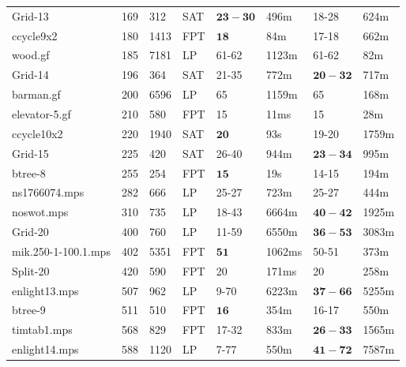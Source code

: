 \documentclass{article}
\begin{document}
\begin{longtable}{|l |l |l |l |l |l |l |l |}
Grid-13&169&312&SAT&$\mathbf{23-30}$&496m&18-28&624m\\
ccycle9x2&180&1413&FPT&$\mathbf{18}$&84m&17-18&662m\\
wood.gf&185&7181&LP&61-62&1123m&61-62&82m\\
Grid-14&196&364&SAT&21-35&772m&$\mathbf{20-32}$&717m\\
barman.gf&200&6596&LP&65&1159m&65&168m\\
elevator-5.gf&210&580&FPT&15&11ms&15&28m\\
ccycle10x2&220&1940&SAT&$\mathbf{20}$&93s&19-20&1759m\\
Grid-15&225&420&SAT&26-40&944m&$\mathbf{23-34}$&995m\\
btree-8&255&254&FPT&$\mathbf{15}$&19s&14-15&194m\\
ns1766074.mps&282&666&LP&25-27&723m&25-27&444m\\
noswot.mps&310&735&LP&18-43&6664m&$\mathbf{40-42}$&1925m\\
Grid-20&400&760&LP&11-59&6550m&$\mathbf{36-53}$&3083m\\
mik.250-1-100.1.mps&402&5351&FPT&$\mathbf{51}$&1062ms&50-51&373m\\
Split-20&420&590&FPT&20&171ms&20&258m\\
enlight13.mps&507&962&LP&9-70&6223m&$\mathbf{37-66}$&5255m\\
btree-9&511&510&FPT&$\mathbf{16}$&354m&16-17&550m\\
timtab1.mps&568&829&FPT&17-32&833m&$\mathbf{26-33}$&1565m\\
enlight14.mps&588&1120&LP&7-77&550m&$\mathbf{41-72}$&7587m\\
\hline
\end{longtable}
\end{document}
